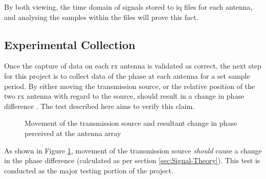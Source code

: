 \documentclass[class=report,11pt,crop=false]{standalone}
\begin{document}
By both viewing, the time domain of signals stored to \gls{iq} files for each antenna, and analysing the samples within the files will prove this fact. 

\subsection{Experimental Collection \label{sec:collection}}
Once the capture of data on each \gls{rx} antenna is validated as correct, the next step for this project is to collect data of the phase at each antenna for a set sample period. By either moving the transmission source, or the relative position of the two \gls{rx} antenna with regard to the source, should result in a change in phase difference \cite{phase-diff-thesis}. The test described here aims to verify this claim.

\begin{figure}[h]\centering
    \hfill
    \hfill 
    \caption{Movement of the transmission source and resultant change in phase perceived at the antenna array}
    \label{fig:phase-change}
\end{figure}

As shown in Figure \ref{fig:phase-change}, movement of the transmission source \emph{should} cause a change in the phase difference (calculated as per section \ref{sec:Signal-Theory}). This test is conducted as the major testing portion of the project.
\end{document}
